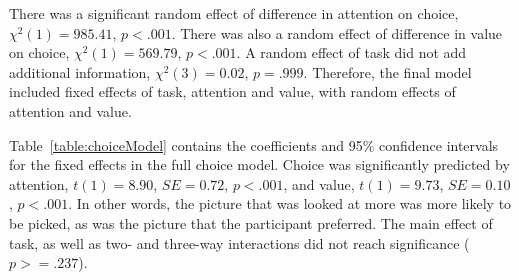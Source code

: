 \documentclass[12pt]{article}
\begin{document}
There was a significant random effect of difference in attention on choice, $\chi^2(1)=985.41$, $p<.001$. There was also a random effect of difference in value on choice, $\chi^2(1)=569.79$, $p<.001$. A random effect of task did not add additional information, $\chi^2(3)=0.02$, $p=.999$. Therefore, the final model included fixed effects of task, attention and value, with random effects of attention and value.



Table~\ref{table:choiceModel} contains the coefficients and 95\% confidence intervals for the fixed effects in the full choice model. Choice was significantly predicted by attention, $t(1)=8.90$, $SE=0.72$, $p<.001$, and value, $t(1)=9.73$, $SE=0.10$, $p<.001$. In other words, the picture that was looked at more was more likely to be picked, as was the picture that the participant preferred. The main effect of task, as well as two- and three-way interactions did not reach significance ($p>=.237$).



\clearpage
\newpage


\end{document}
